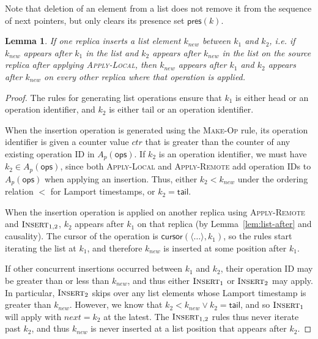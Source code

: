 \documentclass[10pt,journal,compsoc]{IEEEtran}
\newtheorem{lemma}[theorem]{Lemma}
\begin{document}
Note that deletion of an element from a list does not remove it from the sequence of \textsf{next} pointers, but only clears its presence set $\mathsf{pres}(k)$.

\begin{lemma}\label{lem:insert-between}
If one replica inserts a list element $k_\mathit{new}$ between $k_1$ and $k_2$, i.e. if $k_\mathit{new}$ appears after $k_1$ in the list and $k_2$ appears after $k_\mathit{new}$ in the list on the source replica after applying \textsc{Apply-Local}, then $k_\mathit{new}$ appears after $k_1$ and $k_2$ appears after $k_\mathit{new}$ on every other replica where that operation is applied.
\end{lemma}

\begin{proof}
The rules for generating list operations ensure that $k_1$ is either \textsf{head} or an operation identifier, and $k_2$ is either \textsf{tail} or an operation identifier.

When the insertion operation is generated using the \textsc{Make-Op} rule, its operation identifier is given a counter value $\mathit{ctr}$ that is greater than the counter of any existing operation ID in $A_p(\mathsf{ops})$. If $k_2$ is an operation identifier, we must have $k_2 \in A_p(\mathsf{ops})$, since both \textsc{Apply-Local} and \textsc{Apply-Remote} add operation IDs to $A_p(\mathsf{ops})$ when applying an insertion. Thus, either $k_2 < k_\mathit{new}$ under the ordering relation $<$ for Lamport timestamps, or $k_2 = \mathsf{tail}$.

When the insertion operation is applied on another replica using \textsc{Apply-Remote} and $\textsc{Insert}_{1,2}$, $k_2$ appears after $k_1$ on that replica (by Lemma~\ref{lem:list-after} and causality). The cursor of the operation is $\mathsf{cursor}(\langle\dots\rangle, k_1)$, so the rules start iterating the list at $k_1$, and therefore $k_\mathit{new}$ is inserted at some position after $k_1$.

If other concurrent insertions occurred between $k_1$ and $k_2$, their operation ID may be greater than or less than $k_\mathit{new}$, and thus either $\textsc{Insert}_1$ or $\textsc{Insert}_2$ may apply. In particular, $\textsc{Insert}_2$ skips over any list elements whose Lamport timestamp is greater than $k_\mathit{new}$. However, we know that $k_2 < k_\mathit{new} \vee k_2 = \mathsf{tail}$, and so $\textsc{Insert}_1$ will apply with $\mathit{next}=k_2$ at the latest. The $\textsc{Insert}_{1,2}$ rules thus never iterate past $k_2$, and thus $k_\mathit{new}$ is never inserted at a list position that appears after $k_2$.
\end{proof}
\end{document}
